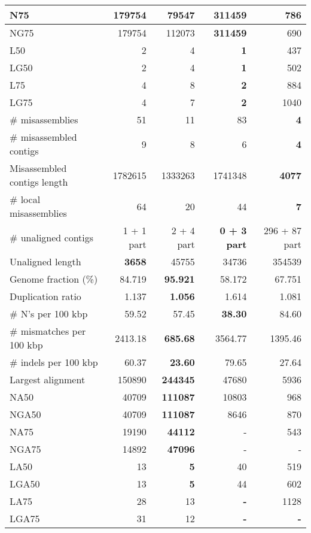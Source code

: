 \documentclass[12pt,a4paper]{article}
\begin{document}
\begin{table}[ht]
\begin{center}
\begin{tabular}{|l*{4}{|r}|}
N75 & 179754 & 79547 & {\bf 311459} & 786 \\ \hline
NG75 & 179754 & 112073 & {\bf 311459} & 690 \\ \hline
L50 & 2 & 4 & {\bf 1} & 437 \\ \hline
LG50 & 2 & 4 & {\bf 1} & 502 \\ \hline
L75 & 4 & 8 & {\bf 2} & 884 \\ \hline
LG75 & 4 & 7 & {\bf 2} & 1040 \\ \hline
\# misassemblies & 51 & 11 & 83 & {\bf 4} \\ \hline
\# misassembled contigs & 9 & 8 & 6 & {\bf 4} \\ \hline
Misassembled contigs length & 1782615 & 1333263 & 1741348 & {\bf 4077} \\ \hline
\# local misassemblies & 64 & 20 & 44 & {\bf 7} \\ \hline
\# unaligned contigs & 1 + 1 part & 2 + 4 part & {\bf 0 + 3 part} & 296 + 87 part \\ \hline
Unaligned length & {\bf 3658} & 45755 & 34736 & 354539 \\ \hline
Genome fraction (\%) & 84.719 & {\bf 95.921} & 58.172 & 67.751 \\ \hline
Duplication ratio & 1.137 & {\bf 1.056} & 1.614 & 1.081 \\ \hline
\# N's per 100 kbp & 59.52 & 57.45 & {\bf 38.30} & 84.60 \\ \hline
\# mismatches per 100 kbp & 2413.18 & {\bf 685.68} & 3564.77 & 1395.46 \\ \hline
\# indels per 100 kbp & 60.37 & {\bf 23.60} & 79.65 & 27.64 \\ \hline
Largest alignment & 150890 & {\bf 244345} & 47680 & 5936 \\ \hline
NA50 & 40709 & {\bf 111087} & 10803 & 968 \\ \hline
NGA50 & 40709 & {\bf 111087} & 8646 & 870 \\ \hline
NA75 & 19190 & {\bf 44112} & - & 543 \\ \hline
NGA75 & 14892 & {\bf 47096} & - & - \\ \hline
LA50 & 13 & {\bf 5} & 40 & 519 \\ \hline
LGA50 & 13 & {\bf 5} & 44 & 602 \\ \hline
LA75 & 28 & 13 & {\bf -} & 1128 \\ \hline
LGA75 & 31 & 12 & {\bf -} & {\bf -} \\ \hline
\end{tabular}
\end{center}
\end{table}
\end{document}
